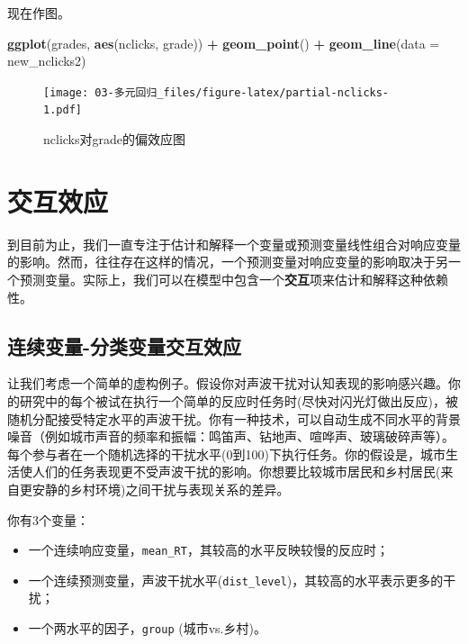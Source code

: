 \documentclass[
]{book}
\newenvironment{Shaded}{\begin{snugshade}}{\end{snugshade}}
\newcommand{\AttributeTok}[1]{\textcolor[rgb]{0.13,0.29,0.53}{#1}}
\newcommand{\FunctionTok}[1]{\textcolor[rgb]{0.13,0.29,0.53}{\textbf{#1}}}
\newcommand{\NormalTok}[1]{#1}
\newcommand{\SpecialCharTok}[1]{\textcolor[rgb]{0.81,0.36,0.00}{\textbf{#1}}}
\providecommand{\tightlist}{%
  \setlength{\itemsep}{0pt}\setlength{\parskip}{0pt}}
\begin{document}
现在作图。

\begin{Shaded}
\begin{Highlighting}[]
\FunctionTok{ggplot}\NormalTok{(grades, }\FunctionTok{aes}\NormalTok{(nclicks, grade)) }\SpecialCharTok{+}
  \FunctionTok{geom\_point}\NormalTok{() }\SpecialCharTok{+}
  \FunctionTok{geom\_line}\NormalTok{(}\AttributeTok{data =}\NormalTok{ new\_nclicks2)}
\end{Highlighting}
\end{Shaded}

\begin{figure}
\centering
\texttt{[image: 03-多元回归\_files/figure-latex/partial-nclicks-1.pdf]}
\caption{\label{fig:partial-nclicks}nclicks对grade的偏效应图}
\end{figure}

\hypertarget{ux4ea4ux4e92ux6548ux5e94}{%
\chapter{交互效应}\label{ux4ea4ux4e92ux6548ux5e94}}

到目前为止，我们一直专注于估计和解释一个变量或预测变量线性组合对响应变量的影响。然而，往往存在这样的情况，一个预测变量对响应变量的影响取决于另一个预测变量。实际上，我们可以在模型中包含一个\textbf{交互}项来估计和解释这种依赖性。

\hypertarget{cont-by-cat}{%
\section{连续变量-分类变量交互效应}\label{cont-by-cat}}

让我们考虑一个简单的虚构例子。假设你对声波干扰对认知表现的影响感兴趣。你的研究中的每个被试在执行一个简单的反应时任务时(尽快对闪光灯做出反应)，被随机分配接受特定水平的声波干扰。你有一种技术，可以自动生成不同水平的背景噪音（例如城市声音的频率和振幅：鸣笛声、钻地声、喧哗声、玻璃破碎声等）。每个参与者在一个随机选择的干扰水平(0到100)下执行任务。你的假设是，城市生活使人们的任务表现更不受声波干扰的影响。你想要比较城市居民和乡村居民(来自更安静的乡村环境)之间干扰与表现关系的差异。

你有3个变量：

\begin{itemize}
\tightlist
\item
  一个连续响应变量，\texttt{mean\_RT}，其较高的水平反映较慢的反应时；
\item
  一个连续预测变量，声波干扰水平(\texttt{dist\_level})，其较高的水平表示更多的干扰；
\item
  一个两水平的因子，\texttt{group} (城市vs.乡村)。
\end{itemize}
\end{document}

